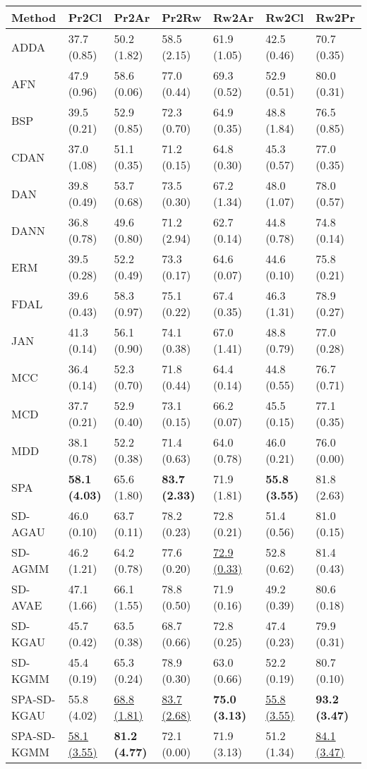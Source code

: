 \vskip 0.5cm
\begin{tabular}{lllllll}
\toprule
Method & Pr2Cl & Pr2Ar & Pr2Rw & Rw2Ar & Rw2Cl & Rw2Pr \\
\midrule
ADDA & 37.7 (0.85) & 50.2 (1.82) & 58.5 (2.15) & 61.9 (1.05) & 42.5 (0.46) & 70.7 (0.35) \\
AFN & 47.9 (0.96) & 58.6 (0.06) & 77.0 (0.44) & 69.3 (0.52) & 52.9 (0.51) & 80.0 (0.31) \\
BSP & 39.5 (0.21) & 52.9 (0.85) & 72.3 (0.70) & 64.9 (0.35) & 48.8 (1.84) & 76.5 (0.85) \\
CDAN & 37.0 (1.08) & 51.1 (0.35) & 71.2 (0.15) & 64.8 (0.30) & 45.3 (0.57) & 77.0 (0.35) \\
DAN & 39.8 (0.49) & 53.7 (0.68) & 73.5 (0.30) & 67.2 (1.34) & 48.0 (1.07) & 78.0 (0.57) \\
DANN & 36.8 (0.78) & 49.6 (0.80) & 71.2 (2.94) & 62.7 (0.14) & 44.8 (0.78) & 74.8 (0.14) \\
ERM & 39.5 (0.28) & 52.2 (0.49) & 73.3 (0.17) & 64.6 (0.07) & 44.6 (0.10) & 75.8 (0.21) \\
FDAL & 39.6 (0.43) & 58.3 (0.97) & 75.1 (0.22) & 67.4 (0.35) & 46.3 (1.31) & 78.9 (0.27) \\
JAN & 41.3 (0.14) & 56.1 (0.90) & 74.1 (0.38) & 67.0 (1.41) & 48.8 (0.79) & 77.0 (0.28) \\
MCC & 36.4 (0.14) & 52.3 (0.70) & 71.8 (0.44) & 64.4 (0.14) & 44.8 (0.55) & 76.7 (0.71) \\
MCD & 37.7 (0.21) & 52.9 (0.40) & 73.1 (0.15) & 66.2 (0.07) & 45.5 (0.15) & 77.1 (0.35) \\
MDD & 38.1 (0.78) & 52.2 (0.38) & 71.4 (0.63) & 64.0 (0.78) & 46.0 (0.21) & 76.0 (0.00) \\
SPA & \textbf{58.1 (4.03)} & 65.6 (1.80) & \textbf{83.7 (2.33)} & 71.9 (1.81) & \textbf{55.8 (3.55)} & 81.8 (2.63) \\
\midrule
SD-AGAU & 46.0 (0.10) & 63.7 (0.11) & 78.2 (0.23) & 72.8 (0.21) & 51.4 (0.56) & 81.0 (0.15) \\
SD-AGMM & 46.2 (1.21) & 64.2 (0.78) & 77.6 (0.20) & \underline{72.9 (0.33)} & 52.8 (0.62) & 81.4 (0.43) \\
SD-AVAE & 47.1 (1.66) & 66.1 (1.55) & 78.8 (0.50) & 71.9 (0.16) & 49.2 (0.39) & 80.6 (0.18) \\
SD-KGAU & 45.7 (0.42) & 63.5 (0.38) & 68.7 (0.66) & 72.8 (0.25) & 47.4 (0.23) & 79.9 (0.31) \\
SD-KGMM & 45.4 (0.19) & 65.3 (0.24) & 78.9 (0.30) & 63.0 (0.66) & 52.2 (0.19) & 80.7 (0.10) \\
SPA-SD-KGAU & 55.8 (4.02) & \underline{68.8 (1.81)} & \underline{83.7 (2.68)} & \textbf{75.0 (3.13)} & \underline{55.8 (3.55)} & \textbf{93.2 (3.47)} \\
SPA-SD-KGMM & \underline{58.1 (3.55)} & \textbf{81.2 (4.77)} & 72.1 (0.00) & 71.9 (3.13) & 51.2 (1.34) & \underline{84.1 (3.47)} \\
\bottomrule
\end{tabular}

